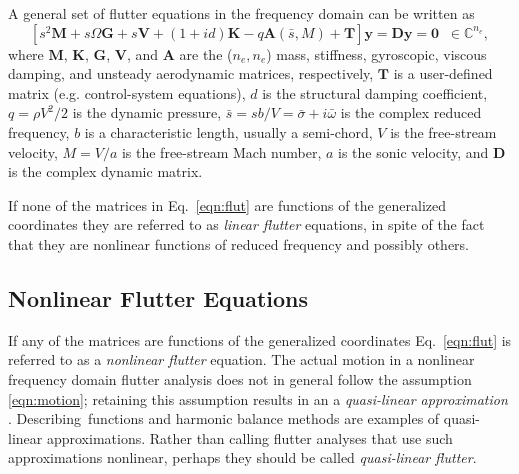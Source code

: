 \documentclass[11pt,openany,twoside]{book}
\numberwithin{equation}{section}		%
\newcommand{\Newterm}[1]{{\em #1}}
\newcommand{\Matrix}[1]{\boldsymbol{#1}}
\newcommand{\Vector}[1]{\boldsymbol{#1}}
\newcommand{\Eqn}[1]{Eq.\ \ref{#1}}  %
\begin{document}
A general set of flutter equations in the frequency domain
can be written as
\begin{equation}\label{eqn:flut}
\left[ s^2 \Matrix{M} + s \Omega\Matrix{G} + s \Matrix{V} +
 (1 + id) \Matrix{K} - q \Matrix{A} (\bar{s},M) + \Matrix{T} \right]
  \Vector{y} = \Matrix{D}\Vector{y} =
  \Vector{0} \; \; \in \mathbb{C}^{n_e},
\end{equation}
where
$\Matrix{M}$, $\Matrix{K}$, $\Matrix{G}$, $\Matrix{V}$, and $\Matrix{A}$
are the ($n_e,n_e$) mass, stiffness, gyroscopic, viscous damping, and
unsteady aerodynamic matrices, respectively,
$\Matrix{T}$ is a user-defined matrix (e.g. control-system equations),
$d$ is the structural damping coefficient,
$q = \rho V^2/2$ is the dynamic pressure,
$\bar{s} = sb/V = \bar{\sigma} + i\bar{\omega}$ is the complex reduced frequency,
$b$ is a characteristic length, usually a semi-chord,
$V$ is the free-stream velocity,
$M = V/a$ is the free-stream Mach number,
$a$ is the sonic velocity, and
$\Matrix{D}$ is the complex dynamic matrix.

If none of the matrices in \Eqn{eqn:flut} are functions of the generalized
coordinates they are referred to as \Newterm{linear flutter} equations,
in spite of the fact that they are nonlinear functions of reduced frequency
and possibly others.

\subsection{Nonlinear Flutter Equations}\label{sect:lco}
If any of the matrices are functions of the generalized coordinates
\Eqn{eqn:flut} is referred to as a \Newterm{nonlinear flutter} equation.
The actual motion in a nonlinear frequency domain flutter analysis 
does not in general follow the assumption \ref{eqn:motion}; retaining this
assumption results in an a
\Newterm{quasi-linear approximation} \cite{gelb1968multiple}.
Describing~functions and harmonic balance methods
are examples of quasi-linear approximations.
Rather than calling flutter analyses that use such approximations
nonlinear, perhaps they should be called \Newterm{quasi-linear flutter}.
\end{document}
